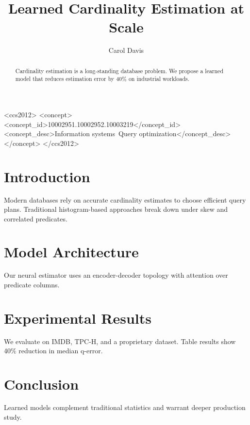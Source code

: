 \documentclass[sigconf]{acmart}
\begin{document}
\title{Learned Cardinality Estimation at Scale}

\author{Carol Davis}

\begin{abstract}
Cardinality estimation is a long-standing database problem. We propose a learned model that reduces estimation error by 40\% on industrial workloads.
\end{abstract}

\begin{CCSXML}
<ccs2012>
<concept><concept_id>10002951.10002952.10003219</concept_id>
<concept_desc>Information systems~Query optimization</concept_desc></concept>
</ccs2012>
\end{CCSXML}



\maketitle

\section{Introduction}
Modern databases rely on accurate cardinality estimates to choose efficient query plans. Traditional histogram-based approaches break down under skew and correlated predicates.

\section{Model Architecture}
Our neural estimator uses an encoder-decoder topology with attention over predicate columns.

\section{Experimental Results}
We evaluate on IMDB, TPC-H, and a proprietary dataset. Table results show 40\% reduction in median q-error.

\section{Conclusion}
Learned models complement traditional statistics and warrant deeper production study.
\end{document}
